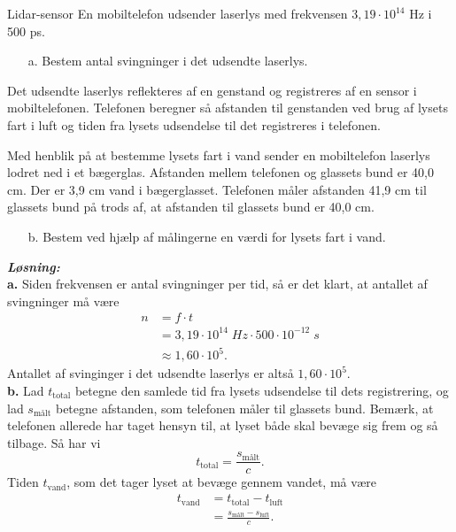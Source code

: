 \documentclass{report}
\newcommand{\sol}{\setlength{\parindent}{0cm}\textbf{\textit{Løsning:}}\setlength{\parindent}{1cm}}
\begin{document}
\begin{question}{Lidar-sensor}{}
  En mobiltelefon udsender laserlys med frekvensen $3,19 \cdot 10^{14}$ Hz i 500 ps.
\begin{itemize}
  \item[a.] Bestem antal svingninger i det udsendte laserlys.
\end{itemize}
Det udsendte laserlys reflekteres af en genstand og registreres af en sensor i mobiltelefonen. Telefonen beregner så afstanden til genstanden ved brug af lysets fart i luft og tiden fra lysets udsendelse til det registreres i telefonen.

Med henblik på at bestemme lysets fart i vand sender en mobiltelefon laserlys lodret ned i et bægerglas. Afstanden mellem telefonen og glassets bund er 40,0 cm. Der er 3,9 cm vand i bægerglasset. Telefonen måler afstanden 41,9 cm til glassets bund på trods af, at afstanden til glassets bund er 40,0 cm.
\begin{itemize}
  \item[b.] Bestem ved hjælp af målingerne en værdi for lysets fart i vand.
\end{itemize}
\end{question}
\sol \\
\textbf{a.}
Siden frekvensen er antal svingninger per tid, så er det klart, at antallet af svingninger må være
\begin{equation*}
\begin{split}
  n&=f \cdot t \\
  &=3,19 \cdot 10 ^{14} \;\unit{Hz}  \cdot 500 \cdot 10 ^{-12} \;\unit{s} \\
  &\approx 1,60 \cdot 10 ^{5}.
\end{split}
\end{equation*}
Antallet af svinginger i det udsendte laserlys er altså $1,60 \cdot 10^5$.\\[1ex]
\textbf{b.}
Lad $t _{\text{total} }$ betegne den samlede tid fra lysets udsendelse til dets registrering, og lad $s _{\text{målt} }$ betegne afstanden, som telefonen måler til glassets bund. 
Bemærk, at telefonen allerede har taget hensyn til, at lyset både skal bevæge sig frem og så tilbage.
Så har vi
\[
t _{\text{total} }=\frac{s _{\text{målt} }}{c}.
\] 
Tiden $t _{\text{vand} }$, som det tager lyset at bevæge gennem vandet, må være
\begin{equation*}
\begin{split}
  t _{\text{vand} } &= t _{\text{total} }-t _{\text{luft} }\\
  &=\frac{s _{\text{målt} }-s _{\text{luft} }}{c}.
\end{split}
\end{equation*}
\end{document}
